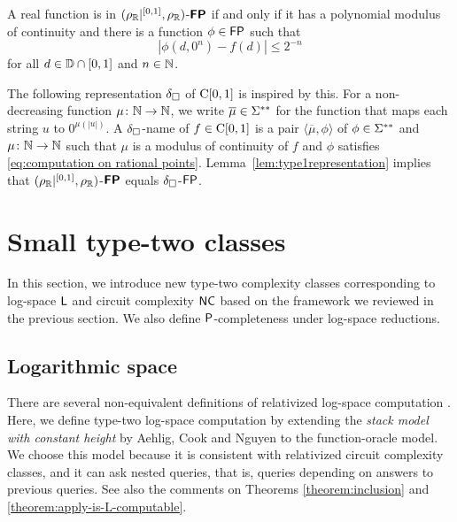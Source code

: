 \documentclass[envcountsect,envcountsame,orivec,oribibl]{llncs}
\begin{document}
\begin{lemma}
 \label{lem:type1representation}
 A real function is in $(\rho _\mathbb R|^{[0,1]},\rho _\mathbb R)$-$\text{\bfseries \sffamily \upshape FP}$ if and only if
 it has a polynomial modulus of continuity 
 and there is a function $\phi \in \mathsf{FP}$ such that 
 \begin{equation}
   \label{eq:computation on rational points}
  |\phi(d, 0^n) - f(d)| \le 2^{-n} 
 \end{equation}
 for all $d \in \mathbb D \cap [0,1]$ and $n \in \mathbb N$. 
\end{lemma}

The following representation $\delta _\square$ of $\mathrm C[0,1]$ 
is inspired by this. 
For a non-decreasing function $\mu \colon \mathbb N \to \mathbb N$, 
we write $\overline \mu \in \Sigma ^{**}$ for the 
function that maps each string $u$ to $0^{\mu(|u|)}$.
A $\delta _\square$-name of $f \in \mathrm C[0,1]$ is 
a pair $\langle \overline{\mu}, \phi \rangle$
of $\phi \in \Sigma ^{**}$ and $\mu \colon \mathbb N \to \mathbb N$
such that 
$\mu$ is a modulus of continuity of $f$
and $\phi$ satisfies \eqref{eq:computation on rational points}.
Lemma~\ref{lem:type1representation} implies that
$(\rho _\mathbb R|^{[0,1]},\rho _\mathbb R)$-$\text{\bfseries \sffamily \upshape FP}$ equals
$\delta _\square$-$\mathsf{FP}$. 

\section{Small type-two classes}
\label{section:small-classes}

In this section, we introduce new type-two complexity classes
corresponding to log-space $\mathsf{L}$ and circuit complexity $\mathsf{NC}$
based on the framework we reviewed in the previous section.
We also define $\mathsf{P}$-completeness under log-space reductions.

\subsection{Logarithmic space}
There are several non-equivalent definitions of 
relativized log-space computation
\cite{aehlig2007relativizing,buss1988relativized,ladner1976relativization,wilson1988measure}.
Here, we define type-two log-space computation 
by extending the {\em stack model with constant height} 
by Aehlig, Cook and Nguyen \cite{aehlig2007relativizing} to the 
function-oracle model.
We choose this model because it is consistent with relativized circuit complexity classes, 
and it can ask nested queries, that is, queries depending on answers to previous queries.
See also the comments on Theorems \ref{theorem:inclusion} and \ref{theorem:apply-is-L-computable}.
\end{document}
